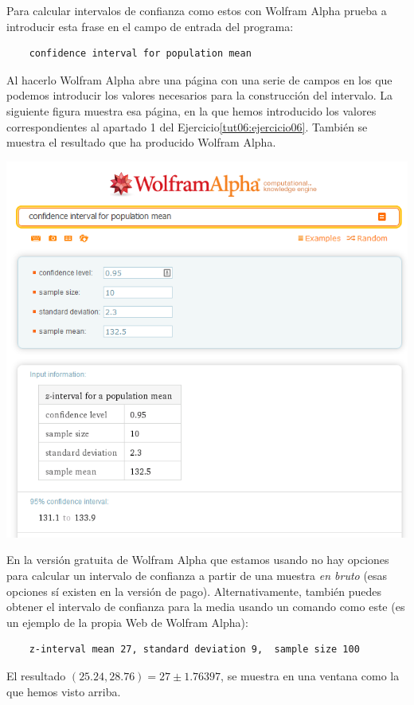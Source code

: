 \documentclass[10pt,a4paper]{article}\usepackage[]{graphicx}\usepackage[]{color}
\begin{document}
Para calcular intervalos de confianza como estos con Wolfram Alpha prueba a introducir  esta frase en el campo de entrada del programa:
\begin{verbatim}
    confidence interval for population mean
\end{verbatim}
Al hacerlo Wolfram Alpha abre una página con una serie de campos en los que podemos introducir los valores necesarios para la construcción del intervalo. La siguiente figura muestra esa página, en la que hemos introducido los valores correspondientes al apartado 1 del Ejercicio\ref{tut06:ejercicio06}. También se muestra el resultado que ha producido Wolfram Alpha.
    \begin{center}
        \includegraphics[width=15cm]{../fig/Tut06-18.png}
    \end{center}
En la versión gratuita de Wolfram Alpha que estamos usando no hay opciones para calcular un intervalo de confianza a partir de una muestra {\em en bruto} (esas opciones sí existen en la versión de pago).
Alternativamente, también puedes obtener el intervalo de confianza para la media usando un comando como este (es un ejemplo de la propia Web de Wolfram Alpha):
\begin{verbatim}
    z-interval mean 27, standard deviation 9,  sample size 100
\end{verbatim}
El resultado $(25.24,28.76)=27\pm 1.76397$, se muestra en una ventana como la que hemos visto arriba.
%
\end{document}
